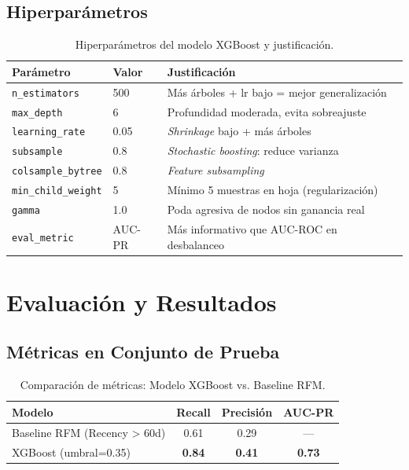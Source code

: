 \documentclass[12pt, letterpaper]{article}
\begin{document}
\subsection{Hiperparámetros}

\begin{table}[H]
\centering
\caption{Hiperparámetros del modelo XGBoost y justificación.}
\label{tab:hyperparams}
\begin{tabular}{lll}
\toprule
\textbf{Parámetro} & \textbf{Valor} & \textbf{Justificación} \\
\midrule
\texttt{n\_estimators} & 500 & Más árboles + lr bajo = mejor generalización \\
\texttt{max\_depth} & 6 & Profundidad moderada, evita sobreajuste \\
\texttt{learning\_rate} & 0.05 & \textit{Shrinkage} bajo + más árboles \\
\texttt{subsample} & 0.8 & \textit{Stochastic boosting}: reduce varianza \\
\texttt{colsample\_bytree} & 0.8 & \textit{Feature subsampling} \\
\texttt{min\_child\_weight} & 5 & Mínimo 5 muestras en hoja (regularización) \\
\texttt{gamma} & 1.0 & Poda agresiva de nodos sin ganancia real \\
\texttt{eval\_metric} & AUC-PR & Más informativo que AUC-ROC en desbalanceo \\
\bottomrule
\end{tabular}
\end{table}

\section{Evaluación y Resultados}

\subsection{Métricas en Conjunto de Prueba}

\begin{table}[H]
\centering
\caption{Comparación de métricas: Modelo XGBoost vs. Baseline RFM.}
\label{tab:results}
\begin{tabular}{lccc}
\toprule
\textbf{Modelo} & \textbf{Recall} & \textbf{Precisión} & \textbf{AUC-PR} \\
\midrule
Baseline RFM (Recency > 60d) & 0.61 & 0.29 & — \\
XGBoost (umbral=0.35) & \textbf{0.84} & \textbf{0.41} & \textbf{0.73} \\
\bottomrule
\end{tabular}
\end{table}
\end{document}
